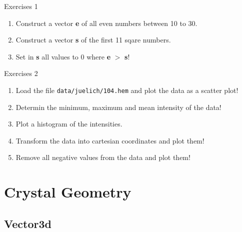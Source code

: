 \documentclass{beamer}
\begin{document}
\begin{frame}
  
  \begin{block}{Exercises 1}
    \begin{enumerate}
      \item  Construct a vector \textbf{e} of all even numbers between 10 to 30.
      \item  Construct a vector \textbf{s} of the first 11 sqare numbers.
      \item  Set in \textbf{s} all values to 0 where \textbf{e} $>$ \textbf{s}!
    \end{enumerate}
  \end{block}

  \begin{block}{Exercises 2}
    \begin{enumerate}
    \item Load the file \texttt{data/juelich/104.hem} and plot the data as a
      scatter plot!
    \item Determin the minimum, maximum and mean
      intensity of the data!
    \item Plot a histogram of the intensities.
    \item Transform the data into cartesian coordinates and plot them!
    \item Remove all negative values from the data and plot them!
    \end{enumerate}
  \end{block}
\end{frame}



\section{Crystal Geometry}



\subsection*{Vector3d}
\end{document}
